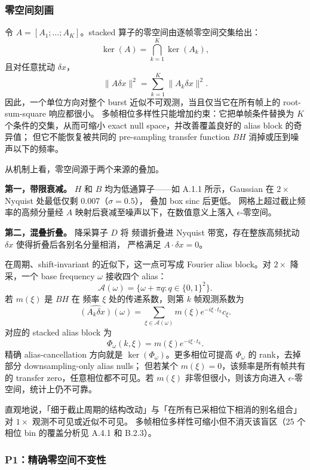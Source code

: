 \subsubsection{零空间刻画}

令 \(A = [A_1;\ldots;A_K]\)。stacked 算子的零空间由逐帧零空间交集给出：
\[
  \ker(A)=\bigcap_{k=1}^K \ker(A_k),
\]
且对任意扰动 \(\delta x\)，
\[
  \|A\delta x\|^2 = \sum_{k=1}^K \|A_k\delta x\|^2.
\]
因此，一个单位方向对整个 burst 近似不可观测，当且仅当它在所有帧上的 root-sum-square 响应都很小。
多帧相位多样性只能增加约束：它把单帧条件替换为 \(K\) 个条件的交集，从而可缩小 exact null space，并改善覆盖良好的 alias block 的奇异值；
但它不能恢复被共同的 pre-sampling transfer function \(B H\) 消掉或压到噪声以下的频率。

从机制上看，零空间源于两个来源的叠加。

\textbf{第一，带限衰减。} \(H\) 和 \(B\) 均为低通算子——如 A.1.1 所示，Gaussian  在 \(2\times\) Nyquist 处最低仅剩 0.007（\(\sigma = 0.5\)），
叠加 box sinc 后更低。 网格上超过截止频率的高频分量经 \(A\) 映射后衰减至噪声以下，在数值意义上落入 \(\epsilon\)-零空间。

\textbf{第二，混叠折叠。} 降采算子 \(D\) 将  频谱折叠进  Nyquist 带宽，存在整族高频扰动 \(\delta x\) 使得折叠后各别名分量相消，
严格满足 \(A \cdot \delta x = 0\)。

在周期、shift-invariant 的近似下，这一点可写成 Fourier alias block。对 \(2\times\) 降采，一个  base frequency \(\omega\) 接收四个  alias：
\[
  \mathcal A(\omega)=\{\omega+\pi q:q\in\{0,1\}^2\}.
\]
若 \(m(\xi)\) 是 \(B H\) 在  频率 \(\xi\) 处的传递系数，则第 \(k\) 帧观测系数为
\[
  \widehat{(A_k\delta x)}(\omega)
  =\sum_{\xi\in\mathcal A(\omega)} m(\xi)e^{-i\xi\cdot t_k}c_\xi.
\]
对应的 stacked alias block 为
\[
  \Phi_\omega(k,\xi)=m(\xi)e^{-i\xi\cdot t_k}.
\]
精确 alias-cancellation 方向就是 \(\ker(\Phi_\omega)\)。更多相位可提高 \(\Phi_\omega\) 的 rank，去掉部分 downsampling-only alias nulls；
但若某个 \(m(\xi)=0\)，该频率是所有帧共有的 transfer zero，任意相位都不可见。若 \(m(\xi)\) 非零但很小，则该方向进入 \(\epsilon\)-零空间，统计上仍不可靠。

直观地说，「细于截止周期的结构改动」与「在所有已采相位下相消的别名组合」对 \(1\times\) 观测不可见或近似不可见。
多帧相位多样性可缩小但不消灭该盲区（25 个相位 bin 的覆盖分析见 A.4.1 和 B.2.3）。

\subsubsection{P1：精确零空间不变性}

